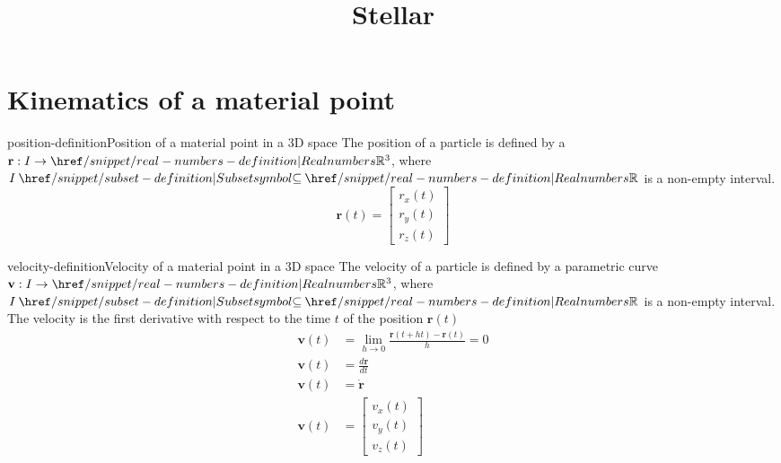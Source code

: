 \documentclass[preview]{standalone}
\begin{document}
\title{Stellar}
\genpage

\section{Kinematics of a material point}


\begin{snippetdefinition}{position-definition}{Position of a material point in a 3D space}
    The position of a particle is defined by a  $\mathbf{r} : I \to \realnumbers^3 $, where $I \subseteq \realnumbers$ is a non-empty interval.
    \[
        \mathbf{r}(t) = \begin{bmatrix}
            r_x(t) \\ r_y(t) \\ r_z(t)
        \end{bmatrix} 
    \] 
\end{snippetdefinition}


\begin{snippetdefinition}{velocity-definition}{Velocity of a material point in a 3D space}
    The velocity of a particle is defined by a parametric curve $\mathbf{v} : I \to \realnumbers^3 $, where $I \subseteq \realnumbers$ is a non-empty interval. \\
    The velocity is the first derivative with respect to the time $t$ of the position $\mathbf{r}(t)$ 
    \begin{align*}
        \mathbf{v}(t) &= \lim_{h \to 0} \frac{\mathbf{r}(t + ht) - \mathbf{r}(t)}{h} = 0 \\
        \mathbf{v}(t) &= \frac{d\mathbf{r}}{dt} \\
        \mathbf{v}(t) &= \dot{\mathbf{r}} \\
        \mathbf{v}(t) &= \begin{bmatrix}
            v_x(t) \\ v_y(t) \\ v_z(t)
        \end{bmatrix}
    \end{align*}
\end{snippetdefinition}

\end{document}

